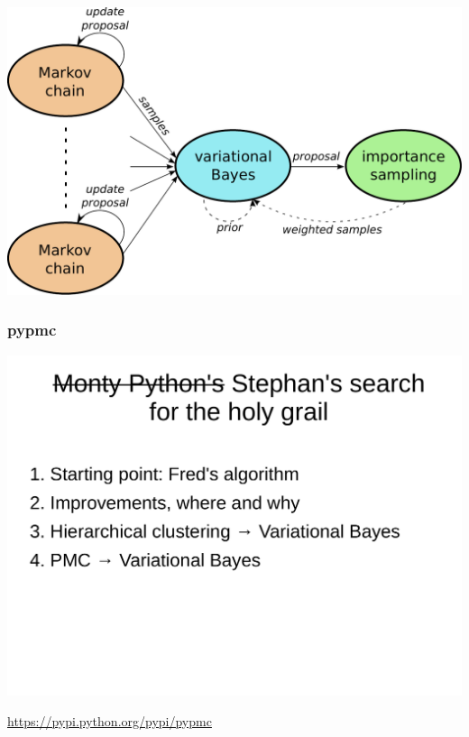 \documentclass[english]{beamer}
\newcommand{\slide}[2][t]{\begin{frame}[#1] \frametitle{\insertsection} #2 \end{frame}}
\begin{document}
\slide[c]{

    \includegraphics[width=\textwidth]{figures/algorithm}

}

\slide{

    \frametitle{{\selectfont pypmc}}

    \vspace{3mm}

    \includegraphics[width=\textwidth,page=6, trim= 0 0 0 5cm, clip]{figures/presentation_22_april}



    \begin{center}
        \url{https://pypi.python.org/pypi/pypmc}
    \end{center}

}
\end{document}
